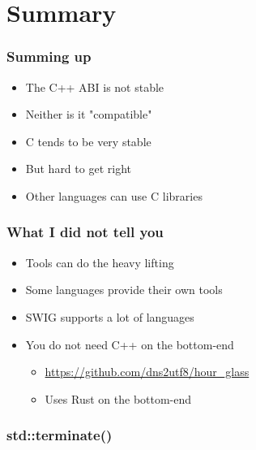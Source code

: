 \section{Summary}

\begin{frame}[c]
  \frametitle{Summing up}
  \pause{}
  \begin{itemize}
    \item{The C++ ABI is not stable}\pause{}
    \item{Neither is it "compatible"}\pause{}
    \item{C tends to be very stable}\pause{}
    \item{But hard to get right}\pause{}
    \item{Other languages can use C libraries}
  \end{itemize}
\end{frame}

\begin{frame}[c]
  \frametitle{What I did not tell you}
  \pause{}
  \begin{itemize}
    \item{Tools can do the heavy lifting}\pause{}
    \item{Some languages provide their own tools}\pause{}
    \item{SWIG supports a lot of languages}\pause{}
    \item{You do not need C++ on the bottom-end}\pause{}
      \begin{itemize}
        \item{\url{https://github.com/dns2utf8/hour_glass}}
        \item{Uses Rust on the bottom-end}
      \end{itemize}
  \end{itemize}
\end{frame}

\begin{frame}[c]
  \frametitle{std::terminate()}
\end{frame}

